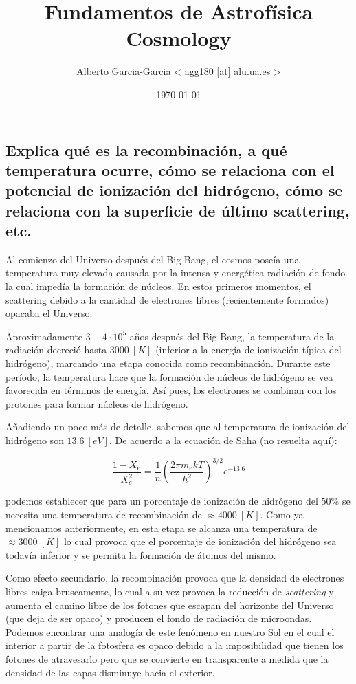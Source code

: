 \documentclass{tufte-handout}
\title{Fundamentos de Astrofísica\\ Cosmology }
\author[Alberto Garcia-Garcia]{Alberto Garcia-Garcia < agg180 [at] alu.ua.es >}
\date{\today}  %
\begin{document}
\maketitle%


\subsection{\textbf{Explica qué es la recombinación, a qué temperatura ocurre, cómo se relaciona con el potencial de ionización del hidrógeno, cómo se relaciona con la superficie de último scattering, etc.}}

Al comienzo del Universo después del Big Bang, el cosmos poseía una temperatura muy elevada causada por la intensa y energética radiación de fondo la cual impedía la formación de núcleos. En estos primeros momentos, el scattering debido a la cantidad de electrones libres (recientemente formados) opacaba el Universo.

Aproximadamente $3-4 \cdot 10^5$ años después del Big Bang, la temperatura de la radiación decreció hasta $3000~[K]$ (inferior a la energía de ionización típica del hidrógeno), marcando una etapa conocida como recombinación. Durante este período, la temperatura hace que la formación de núcleos de hidrógeno se vea favorecida en términos de energía. Así pues, los electrones se combinan con los protones para formar núcleos de hidrógeno.

Añadiendo un poco más de detalle, sabemos que al temperatura de ionización del hidrógeno son $13.6~[eV]$. De acuerdo a la ecuación de Saha (no resuelta aquí):

\begin{equation}
\frac{1 - X_e}{X_e^2} = \frac{1}{n}(\frac{2\pi m_e k T}{h^2})^{3/2} e^{-13.6}
\end{equation}

podemos establecer que para un porcentaje de ionización de hidrógeno del $50\%$ se necesita una temperatura de recombinación de $\approx 4000~[K]$. Como ya mencionamos anteriormente, en esta etapa se alcanza una temperatura de $\approx 3000~[K]$ lo cual provoca que el porcentaje de ionización del hidrógeno sea todavía inferior y se permita la formación de átomos del mismo.

Como efecto secundario, la recombinación provoca que la densidad de electrones libres caiga bruscamente, lo cual a su vez provoca la reducción de \emph{scattering} y aumenta el camino libre de los fotones que escapan del horizonte del Universo (que deja de ser opaco) y producen el fondo de radiación de microondas. Podemos encontrar una analogía de este fenómeno en nuestro Sol en el cual el interior a partir de la fotosfera es opaco debido a la imposibilidad que tienen los fotones de atravesarlo pero que se convierte en transparente a medida que la densidad de las capas disminuye hacia el exterior.
\end{document}
